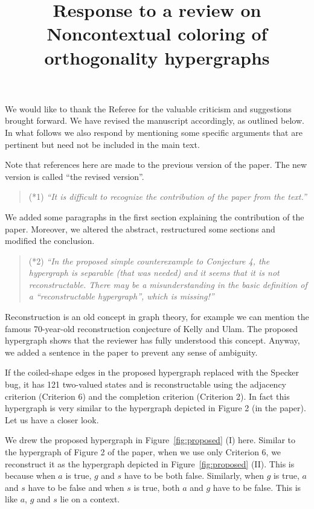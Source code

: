 \documentclass[12pt,a4paper]{article}
\date{}
\title{Response to a review on\\
{\bf Noncontextual coloring of orthogonality hypergraphs}}
\author{}
\theoremstyle{definition}
\numberwithin{equation}{section}
\begin{document}
        \maketitle

        We would like to thank the Referee for the valuable criticism and suggestions brought forward. We have revised the manuscript accordingly, as outlined below. In what follows we also respond by mentioning some specific arguments that are pertinent but need not be included in the main text.

        Note that references here are made to the previous version of the paper. The new version is called ``the revised version''.

\begin{quotation}
        (*1) {\it ``It is difficult to recognize the contribution of the paper from the text.''}
\end{quotation}

We added some paragraphs in the first section explaining the contribution of the paper. Moreover, we altered the abstract, restructured some sections and modified the conclusion.

\begin{quotation}
        (*2) {\it ``In the proposed simple counterexample to Conjecture 4, the hypergraph is separable (that was needed) and it seems that it is not reconstructable.
        There may be a misunderstanding in the basic definition of a ``reconstructable hypergraph'', which is missing!''}
\end{quotation}

Reconstruction is an old concept in graph theory, for example we can mention the famous 70-year-old reconstruction conjecture of Kelly and Ulam. The proposed hypergraph shows that the reviewer has fully understood this concept. Anyway, we added a sentence in the paper to prevent any sense of ambiguity.

If the coiled-shape edges in the proposed hypergraph replaced with the Specker bug, it has 121 two-valued states and is reconstructable using the adjacency criterion (Criterion 6) and the completion criterion (Criterion 2). In fact this hypergraph is very similar to the hypergraph depicted in Figure 2 (in the paper). Let us have a closer look.

We drew the proposed hypergraph in Figure~\ref{fig:proposed} (I) here. Similar to the hypergraph of Figure 2 of the paper, when we use only Criterion 6, we reconstruct it as the hypergraph depicted in Figure~\ref{fig:proposed} (II). This is because when $a$ is true, $g$ and $s$ have to be both false. Similarly, when $g$ is true, $a$ and $s$ have to be false and when $s$ is true, both $a$ and $g$ have to be false. This is like $a$, $g$ and $s$ lie on a context.
\end{document}

